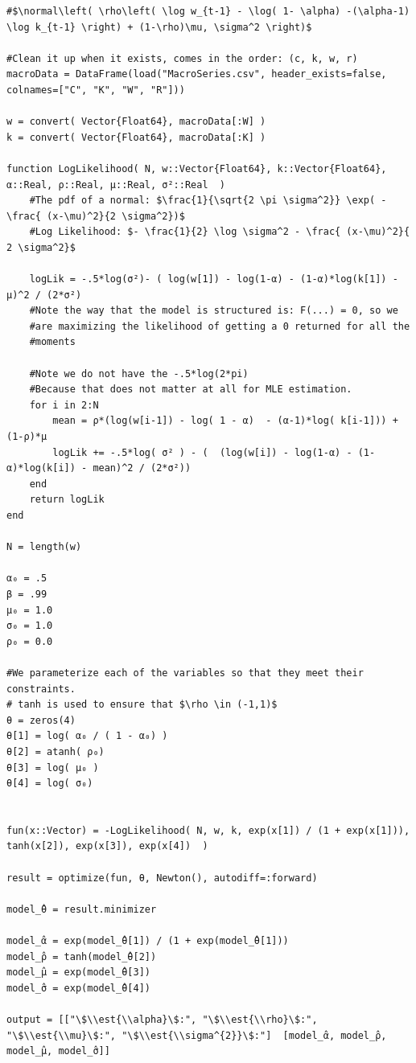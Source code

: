 \documentclass[12pt, letterpaper]{paper}
\begin{document}
\begin{verbatim}
#$\normal\left( \rho\left( \log w_{t-1} - \log( 1- \alpha) -(\alpha-1) \log k_{t-1} \right) + (1-\rho)\mu, \sigma^2 \right)$

#Clean it up when it exists, comes in the order: (c, k, w, r)
macroData = DataFrame(load("MacroSeries.csv", header_exists=false, colnames=["C", "K", "W", "R"]))

w = convert( Vector{Float64}, macroData[:W] )
k = convert( Vector{Float64}, macroData[:K] )

function LogLikelihood( N, w::Vector{Float64}, k::Vector{Float64}, α::Real, ρ::Real, μ::Real, σ²::Real  )
    #The pdf of a normal: $\frac{1}{\sqrt{2 \pi \sigma^2}} \exp( - \frac{ (x-\mu)^2}{2 \sigma^2})$
    #Log Likelihood: $- \frac{1}{2} \log \sigma^2 - \frac{ (x-\mu)^2}{ 2 \sigma^2}$

    logLik = -.5*log(σ²)- ( log(w[1]) - log(1-α) - (1-α)*log(k[1]) - μ)^2 / (2*σ²)
    #Note the way that the model is structured is: F(...) = 0, so we
    #are maximizing the likelihood of getting a 0 returned for all the
    #moments

    #Note we do not have the -.5*log(2*pi)
    #Because that does not matter at all for MLE estimation.
    for i in 2:N
        mean = ρ*(log(w[i-1]) - log( 1 - α)  - (α-1)*log( k[i-1])) + (1-ρ)*μ
        logLik += -.5*log( σ² ) - (  (log(w[i]) - log(1-α) - (1-α)*log(k[i]) - mean)^2 / (2*σ²))
    end
    return logLik
end

N = length(w)

α₀ = .5
β = .99
μ₀ = 1.0
σ₀ = 1.0
ρ₀ = 0.0

#We parameterize each of the variables so that they meet their constraints.
# tanh is used to ensure that $\rho \in (-1,1)$
θ = zeros(4)
θ[1] = log( α₀ / ( 1 - α₀) )
θ[2] = atanh( ρ₀)
θ[3] = log( μ₀ )
θ[4] = log( σ₀)


fun(x::Vector) = -LogLikelihood( N, w, k, exp(x[1]) / (1 + exp(x[1])), tanh(x[2]), exp(x[3]), exp(x[4])  )

result = optimize(fun, θ, Newton(), autodiff=:forward)

model_̂θ = result.minimizer

model_̂α = exp(model_̂θ[1]) / (1 + exp(model_̂θ[1]))
model_̂ρ = tanh(model_̂θ[2])
model_̂μ = exp(model_̂θ[3])
model_̂σ = exp(model_̂θ[4])

output = [["\$\\est{\\alpha}\$:", "\$\\est{\\rho}\$:", "\$\\est{\\mu}\$:", "\$\\est{\\sigma^{2}}\$:"]  [model_̂α, model_̂ρ, model_̂μ, model_̂σ]]
\end{verbatim}
\end{document}
